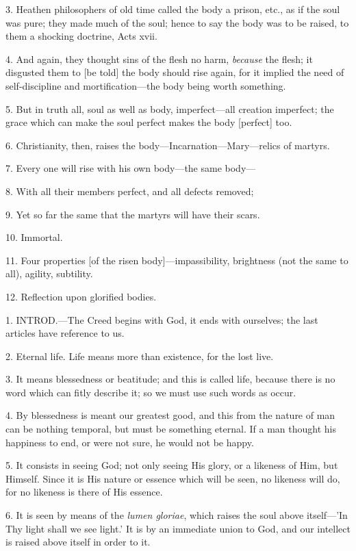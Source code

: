 3. Heathen philosophers of old time called the
body a prison, etc., as if the soul was pure; they made much of the
soul; hence to say the body was to be raised, to them a shocking
doctrine, Acts xvii.

4. And again, they thought sins of the flesh no
harm, \emph{because} the flesh; it disgusted them to [be told]
the body should rise again, for it implied the need of self-discipline
and mortification—the body being worth something.

5. But in truth all, soul as well as body,
imperfect—all creation imperfect; the grace which can make the soul
perfect makes the body [perfect] too.

6. Christianity, then, raises the
body—Incarnation—Mary—relics of martyrs.

7. Every one will rise with his own body—the
same body—

8. With all their members perfect, and all
defects removed;

9. Yet so far the same that the martyrs will have
their scars.

10. Immortal.

11. Four properties [of the risen
body]—impassibility, brightness (not the same to all), agility,
subtility.

12. Reflection upon glorified bodies.


1. INTROD.—The
Creed begins with God, it ends with ourselves; the last articles have
reference to us.

2. Eternal life. Life means more than existence,
for the lost live.

3. It means blessedness or beatitude; and this is
called life, because there is no word which can fitly describe it; so
we must use such words as occur.

4. By blessedness is meant our greatest good, and
this from the nature of man can be nothing temporal, but must be
something eternal. If a man thought his happiness to end, or were not
sure, he would not be happy.

5. It consists in seeing God; not only seeing His
glory, or a likeness of Him, but Himself. Since it is His nature or
essence which will be seen, no likeness will do, for no likeness is
there of His essence.

6. It is seen by means of the \emph{lumen gloriae},
which raises the soul above itself—'In Thy light shall we see
light.' It is by an immediate union to God, and our intellect is
raised above itself in order to it.

